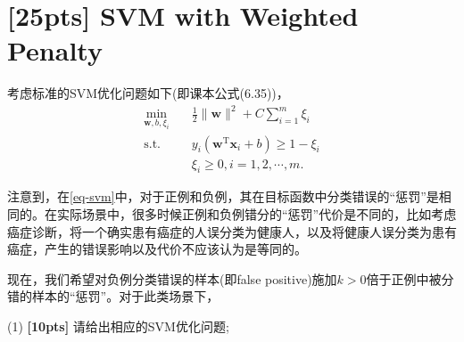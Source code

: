 \documentclass[a4paper,UTF8]{article}
\numberwithin{equation}{section}
\theoremstyle{definition}
\begin{document}
\section{[25pts] SVM with Weighted Penalty}
考虑标准的SVM优化问题如下(即课本公式(6.35))，
\begin{equation}
\label{eq-svm}
\begin{split}
\min_{\mathbf{w},b,\xi_i}& \quad \frac{1}{2} \lVert \mathbf{w} \rVert^2 + C\sum_{i=1}^m\xi_i\\
\text{s.t.}&  \quad y_i(\mathbf{w}^\mathrm{T}\mathbf{x}_i + b)\geq 1-\xi_i\\
& \quad \xi_i \geq 0, i = 1,2,\cdots,m.
\end{split}
\end{equation}

注意到，在\eqref{eq-svm}中，对于正例和负例，其在目标函数中分类错误的“惩罚”是相同的。在实际场景中，很多时候正例和负例错分的“惩罚”代价是不同的，比如考虑癌症诊断，将一个确实患有癌症的人误分类为健康人，以及将健康人误分类为患有癌症，产生的错误影响以及代价不应该认为是等同的。

现在，我们希望对负例分类错误的样本(即false positive)施加$k>0$倍于正例中被分错的样本的“惩罚”。对于此类场景下，

(1) \textbf{[10pts]} 请给出相应的SVM优化问题;
\end{document}
